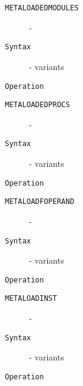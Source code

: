 \clearpage
\begin{description}
\item[\texttt{METALOADEDMODULES}]  - \\
\item[\texttt{Syntax}] - variants\\

\item[\texttt{Operation}]
\item[\texttt{}]
\end{description}
\clearpage
\begin{description}
\item[\texttt{METALOADEDPROCS}]  - \\
\item[\texttt{Syntax}] - variants\\

\item[\texttt{Operation}]
\item[\texttt{}]
\end{description}
\clearpage
\begin{description}
\item[\texttt{METALOADFOPERAND}]  - \\
\item[\texttt{Syntax}] - variants\\

\item[\texttt{Operation}]
\item[\texttt{}]
\end{description}
\clearpage
\begin{description}
\item[\texttt{METALOADINST}]  - \\
\item[\texttt{Syntax}] - variants\\

\item[\texttt{Operation}]
\item[\texttt{}]
\end{description}
